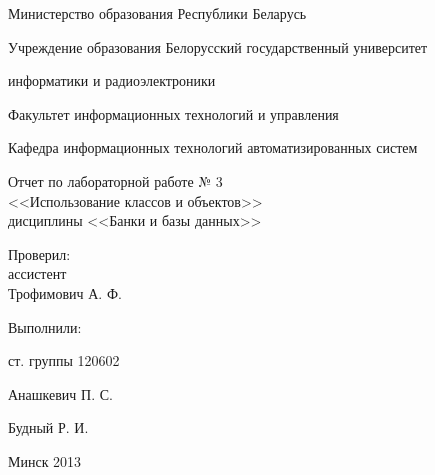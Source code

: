 \thispagestyle{empty}

\begin{center}
Министерство образования Республики Беларусь\par
\vspace{2mm}
Учреждение образования Белорусский государственный университет\par
информатики и радиоэлектроники\par 
\vspace{2mm}
Факультет информационных технологий и управления\par
\vspace{2mm}
Кафедра информационных технологий автоматизированных систем\par

\end{center}

\vspace{50mm}

\begin{center}
  Отчет по лабораторной работе № 3 \\
  <<Использование классов и объектов>> \\
  дисциплины <<Банки и базы данных>>
\end{center}

\vspace{40mm}

\begin{multicols}{2}
\begin{flushleft}
  Проверил: \\
  ассистент \\
  Трофимович А. Ф.
\end{flushleft}

\begin{flushright}
  Выполнили:

  ст. группы 120602

  Анашкевич П. С.

  Будный Р. И.

\end{flushright}
\end{multicols}

\vspace{40mm}
\begin{center}
Минск 2013
\end{center}

\newpage

